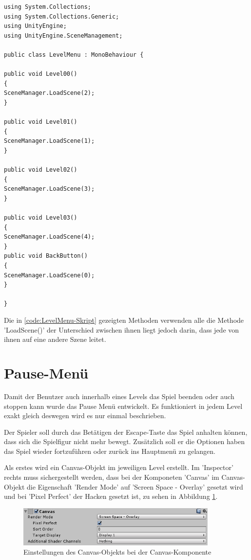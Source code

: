 \begin{lstlisting}[language={[Sharp]C}, caption=LevelMenu-Script, label=code:LevelMenu-Skript]
using System.Collections;
using System.Collections.Generic;
using UnityEngine;
using UnityEngine.SceneManagement;

public class LevelMenu : MonoBehaviour {

public void Level00()
{
SceneManager.LoadScene(2);
}

public void Level01()
{
SceneManager.LoadScene(1);
}

public void Level02()
{
SceneManager.LoadScene(3);
}

public void Level03()
{
SceneManager.LoadScene(4);
}
public void BackButton()
{
SceneManager.LoadScene(0);
}

}
\end{lstlisting}

Die in \cref{code:LevelMenu-Skript} gezeigten Methoden verwenden alle die Methode 'LoadScene()' der Unterschied zwischen ihnen liegt jedoch darin, dass jede von ihnen auf eine andere Szene leitet.
\section{Pause-Menü}
Damit der Benutzer auch innerhalb eines Levels das Spiel beenden oder auch stoppen kann wurde das Pause Menü entwickelt. Es funktioniert in jedem Level exakt gleich deswegen wird es nur einmal beschrieben. 

Der Spieler soll durch das Betätigen der Escape-Taste das Spiel anhalten können, dass sich die Spielfigur nicht mehr bewegt. Zusätzlich soll er die Optionen haben das Spiel wieder fortzuführen oder zurück ins Hauptmenü zu gelangen. 

Als erstes wird ein Canvas-Objekt im jeweiligen Level erstellt. Im 'Inspector' rechts muss sichergestellt werden, dass bei der Komponeten 'Canvas' im Canvas-Objekt die Eigenschaft 'Render Mode' auf 'Screen Space - Overlay' gesetzt wird und bei 'Pixel Perfect' der Hacken gesetzt ist, zu sehen in Abbildung \ref{CanvasPause}. 


\begin{figure}[H]
	\includegraphics[width=10cm]{images/CanvasPause.png}
	\caption{Einstellungen des Canvas-Objekts bei der Canvas-Komponente}
	\label{CanvasPause}
\end{figure}


